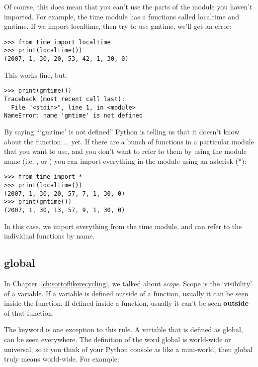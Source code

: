 Of course, this does mean that you can't use the parts of the module you haven't imported.  For example, the time module has a functions called localtime and gmtime.  If we import localtime, then try to use gmtime, we'll get an error:

\begin{Verbatim}[frame=single]
>>> from time import localtime
>>> print(localtime())
(2007, 1, 30, 20, 53, 42, 1, 30, 0)
\end{Verbatim}

\noindent
This works fine, but:

\begin{Verbatim}[frame=single]
>>> print(gmtime())
Traceback (most recent call last):
  File "<stdin>", line 1, in <module>
NameError: name 'gmtime' is not defined
\end{Verbatim}

By saying ```gmtime' is not defined'' Python is telling us that it doesn't know about the function $\ldots$ yet. If there are a bunch of functions in a particular module that you want to use, and you don't want to refer to them by using the module name (i.e. , or ) you can import everything in the module using an asterisk (*):

\begin{Verbatim}[frame=single]
>>> from time import *
>>> print(localtime())
(2007, 1, 30, 20, 57, 7, 1, 30, 0)
>>> print(gmtime())
(2007, 1, 30, 13, 57, 9, 1, 30, 0)
\end{Verbatim}

In this case, we import everything from the time module, and can refer to the individual functions by name.

\subsection*{global}

In Chapter~\ref{ch:sortoflikerecycling}, we talked about \emph{scope}.  Scope is the `visibility' of a variable. If a variable is defined outside of a function, usually it can be seen inside the function. If defined inside a function, usually it can't be seen \textbf{outside} of that function.
\par
The  keyword is one exception to this rule. A variable that is defined as global, can be seen everywhere. The definition of the word global is world-wide or universal, so if you think of your Python console as like a mini-world, then global truly means world-wide.  For example:

